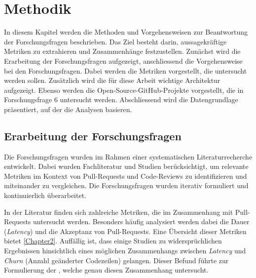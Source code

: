


\chapter{Methodik} %

\label{Chapter3} %

In diesem Kapitel werden die Methoden und Vorgehensweisen zur Beantwortung der Forschungsfragen beschrieben. Das Ziel besteht darin, aussagekräftige Metriken zu extrahieren und Zusammenhänge festzustellen.
Zunächst wird die Erarbeitung der Forschungsfragen aufgezeigt, anschliessend die Vorgehensweise bei den Forschungsfragen. Dabei werden die Metriken vorgestellt, die untersucht werden sollen. Zusätzlich wird die für diese Arbeit wichtige Architektur aufgezeigt. Ebenso werden die Open-Source-GitHub-Projekte vorgestellt, die in Forschungsfrage 6 untersucht werden. Abschliessend wird die Datengrundlage präsentiert, auf der die Analysen basieren.

\section{Erarbeitung der Forschungsfragen}
\label{sec:ErarbeitungFF}
Die Forschungsfragen wurden im Rahmen einer systematischen Literaturrecherche entwickelt. Dabei wurden Fachliteratur und Studien berücksichtigt, um relevante Metriken im Kontext von Pull-Requests und Code-Reviews zu identifizieren und miteinander zu vergleichen. Die Forschungsfragen wurden iterativ formuliert und kontinuierlich überarbeitet.

In der Literatur finden sich zahlreiche Metriken, die im Zusammenhang mit Pull-Requests untersucht werden. Besonders häufig analysiert werden dabei die Dauer (\textit{Latency}) und die Akzeptanz von Pull-Requests. Eine Übersicht dieser Metriken bietet \autoref{Chapter2}. Auffällig ist, dass einige Studien zu widersprüchlichen Ergebnissen hinsichtlich eines möglichen Zusammenhangs zwischen \textit{Latency} und \textit{Churn} (Anzahl geänderter Codezeilen) gelangen. Dieser Befund führte zur Formulierung der , welche genau diesen Zusammenhang untersucht.


